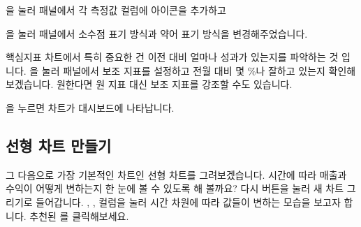\documentclass[letterpaper,10pt,english]{sphinxmanual}
\begin{document}
을 눌러  패널에서 각 측정값 컬럼에 아이콘을 추가하고
\begin{quote}

\begin{figure}[H]
\centering

\noindent{}
\end{figure}
\end{quote}

을 눌러  패널에서 소수점 표기 방식과 약어 표기 방식을 변경해주었습니다.
\begin{quote}

\begin{figure}[H]
\centering

\noindent{}
\end{figure}
\end{quote}

핵심지표 차트에서 특히 중요한 건 이전 대비 얼마나 성과가 있는지를 파악하는 것 입니다. 을 눌러  패널에서 보조 지표를 설정하고 전월 대비 몇 \%나 잘하고 있는지 확인해보겠습니다. 원한다면 원 지표 대신 보조 지표를 강조할 수도 있습니다.
\begin{quote}

\begin{figure}[H]
\centering

\noindent{}
\end{figure}
\end{quote}

을 누르면 차트가 대시보드에 나타납니다.
\begin{quote}

\begin{figure}[H]
\centering

\noindent{}
\end{figure}
\end{quote}


\subsection{선형 차트 만들기}
\label{\detokenize{discovery/part00/step3:id2}}
그 다음으로 가장 기본적인 차트인 선형 차트를 그려보겠습니다. 시간에 따라 매출과 수익이 어떻게 변하는지 한 눈에 볼 수 있도록 해 볼까요? 다시  버튼을 눌러 새 차트 그리기로 들어갑니다. , ,  컬럼을 눌러 시간 차원에 따라 값들이 변하는 모습을 보고자 합니다. 추천된 를 클릭해보세요.
\begin{quote}

\begin{figure}[H]
\centering

\noindent{}
\end{figure}
\end{quote}
\end{document}
